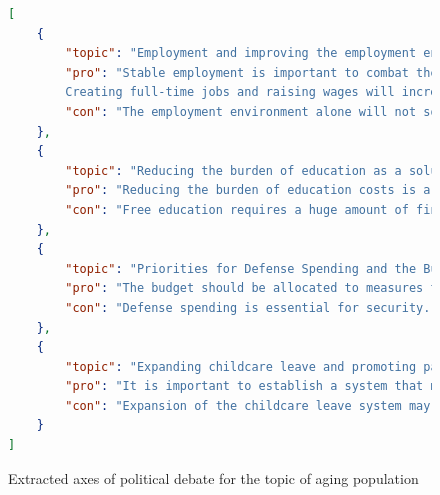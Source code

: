 \documentclass[final,5p,times,twocolumn,authoryear]{elsarticle}
\begin{document}
\begin{figure}[h]
\centering
      \begin{lstlisting}[language=json,firstnumber=1]
[
    {
        "topic": "Employment and improving the employment environment to combat the declining birthrate",
        "pro": "Stable employment is important to combat the declining birthrate.
        Creating full-time jobs and raising wages will increase young people's  willingness to marry and raise children.",
        "con": "The employment environment alone will not solve the problem of declining birthrates.Comprehensive support measures are needed, and aspects other than just the economy should be strengthened."
    },
    {
        "topic": "Reducing the burden of education as a solution to the declining birthrate", 
        "pro": "Reducing the burden of education costs is a measure to counteract the declining birthrate.We need to promote free education from early childhood to higher education.",
        "con": "Free education requires a huge amount of financial resources and should be proceeded with caution because of the burden it will place on public finances."
    },
    {
        "topic": "Priorities for Defense Spending and the Budget for Low Fertility", 
        "pro": "The budget should be allocated to measures to combat the declining birthrate rather than defense spending. We need to support childcare for the future of the country." ,
        "con": "Defense spending is essential for security. The security of the nation is the only way to improve the child-rearing environment."
    },
    {
        "topic": "Expanding childcare leave and promoting participation", {
        "pro": "It is important to establish a system that makes it easier for both men and women to take childcare leave. Increased participation in childcare will lead to an increase in the birth rate." ,
        "con": "Expansion of the childcare leave system may become a burden on companies, resulting in a negative impact."
    }
]
\end{lstlisting}

\caption{Extracted axes of political debate for the topic of aging population}
\label{fig: extracted axes aging population}
\end{figure}
\end{document}
